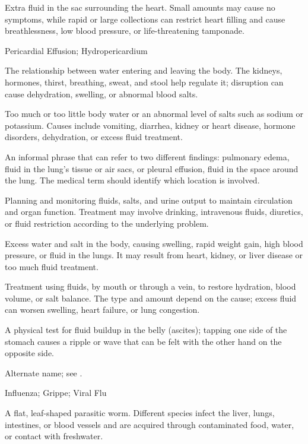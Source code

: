  Extra fluid in the sac surrounding the heart. Small amounts may cause no symptoms, while rapid or large collections can restrict heart filling and cause breathlessness, low blood pressure, or life-threatening tamponade.

\synonyms
Pericardial Effusion; Hydropericardium

 The relationship between water entering and leaving the body. The kidneys, hormones, thirst, breathing, sweat, and stool help regulate it; disruption can cause dehydration, swelling, or abnormal blood salts.

 Too much or too little body water or an abnormal level of salts such as sodium or potassium. Causes include vomiting, diarrhea, kidney or heart disease, hormone disorders, dehydration, or excess fluid treatment.

 An informal phrase that can refer to two different findings: pulmonary edema, fluid in the lung’s tissue or air sacs, or pleural effusion, fluid in the space around the lung. The medical term should identify which location is involved.

 Planning and monitoring fluids, salts, and urine output to maintain circulation and organ function. Treatment may involve drinking, intravenous fluids, diuretics, or fluid restriction according to the underlying problem.

 Excess water and salt in the body, causing swelling, rapid weight gain, high blood pressure, or fluid in the lungs. It may result from heart, kidney, or liver disease or too much fluid treatment.

 Treatment using fluids, by mouth or through a vein, to restore hydration, blood volume, or salt balance. The type and amount depend on the cause; excess fluid can worsen swelling, heart failure, or lung congestion.

 A physical test for fluid buildup in the belly (ascites); tapping one side of the stomach causes a ripple or wave that can be felt with the other hand on the opposite side.

 Alternate name; see .

\synonyms
Influenza; Grippe; Viral Flu

 A flat, leaf-shaped parasitic worm. Different species infect the liver, lungs, intestines, or blood vessels and are acquired through contaminated food, water, or contact with freshwater.

